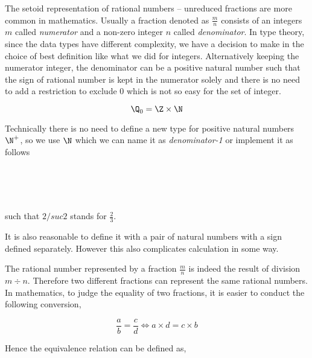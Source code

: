 The setoid representation of rational numbers -- unreduced fractions
are more common in mathematics.
Usually a fraction denoted as $\frac{m}{n}$ consists of an integers
$m$ called \emph{numerator} and a non-zero integer $n$ called
\emph{denominator}.
In type theory, since the data types have different
complexity, we have a decision to make in the choice of best
definition like what we did for integers.
Alternatively keeping the numerator integer, the denominator can be a
positive natural number such that the sign of rational number is kept
in the numerator solely and there is no need to add a restriction to
exclude $0$ which is not so easy for the set of integer.

$$\Q_0 = \Z \times \N$$

Technically there is no need to define a new type for positive
natural numbers $\N^{+}$, so we use $\N$ which we can name it as
\emph{denominator-1} or implement it as follows

\begin{code}
\\
\>  \AgdaSymbol{:}  \<%
\\
\>[-1]\<[2]%
\>[2] \AgdaSymbol{:} \AgdaSymbol{(} \AgdaSymbol{:} \AgdaSymbol{)}  \AgdaSymbol{(} \AgdaSymbol{:} \AgdaSymbol{)}  \<%
\\
\end{code}

such that $2 /suc 2$ stands for $\frac{2}{3}$.


\begin{remark}
It is also reasonable to define it with a pair of natural numbers with
a sign defined separately. However this also complicates calculation
in some way.
\end{remark}



The rational number represented by a fraction $\frac{m}{n}$ is indeed the result of
division $m \div n$. Therefore two different fractions can represent
the same rational numbers.
In mathematics, to judge the equality of two fractions, it is easier to conduct the following conversion,

$$ \frac{a}{b} = \frac{c}{d} \iff a \times d = c \times b $$


Hence the equivalence relation can be defined as,

